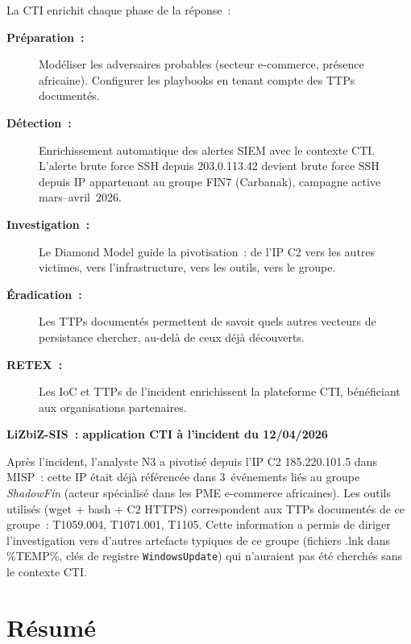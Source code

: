 La CTI enrichit chaque phase de la réponse~:

\begin{description}
  \item[\textbf{Préparation~:}] Modéliser les adversaires probables
        (secteur e-commerce, présence africaine). Configurer les
        playbooks en tenant compte des TTPs documentés.
  \item[\textbf{Détection~:}] Enrichissement automatique des alertes SIEM
        avec le contexte CTI. L'alerte \og{}brute force SSH depuis
        203.0.113.42\fg{} devient \og{}brute force SSH depuis IP appartenant
        au groupe FIN7 (Carbanak), campagne active mars--avril~2026\fg{}.
  \item[\textbf{Investigation~:}] Le Diamond Model guide la pivotisation~:
        de l'IP C2 vers les autres victimes, vers l'infrastructure,
        vers les outils, vers le groupe.
  \item[\textbf{Éradication~:}] Les TTPs documentés permettent de savoir
        quels autres vecteurs de persistance chercher, au-delà
        de ceux déjà découverts.
  \item[\textbf{RETEX~:}] Les IoC et TTPs de l'incident enrichissent
        la plateforme CTI, bénéficiant aux organisations partenaires.
\end{description}

\begin{boxlizbiz}
\textbf{LiZbiZ-SIS~: application CTI à l'incident du 12/04/2026}

Après l'incident, l'analyste N3 a pivotisé depuis l'IP C2
185.220.101.5 dans MISP~: cette IP était déjà référencée dans
3~événements liés au groupe \textit{ShadowFin} (acteur spécialisé
dans les PME e-commerce africaines). Les outils utilisés (wget + bash
+ C2 HTTPS) correspondent aux TTPs documentés de ce groupe~:
T1059.004, T1071.001, T1105. Cette information a permis de diriger
l'investigation vers d'autres artefacts typiques de ce groupe
(fichiers .lnk dans \%TEMP\%, clés de registre \texttt{WindowsUpdate})
qui n'auraient pas été cherchés sans le contexte CTI.
\end{boxlizbiz}

\section*{Résumé}

